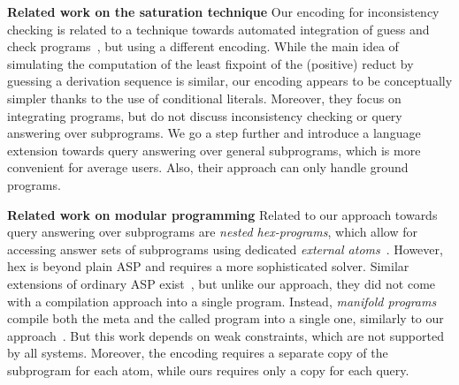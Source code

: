 \documentclass[11pt,fleqn,twoside]{article}
\newcommand{\leanparagraph}[1]{\smallskip\noindent\textbf{#1}}
\newcommand\hex{{\sc hex}\xspace}
\begin{document}
		\leanparagraph{Related work on the saturation technique}
		Our encoding for inconsistency checking is related to a technique towards automated integration of guess and check programs~\cite{DBLP:journals/tplp/EiterP06},
		but using a different encoding.
		While the main idea of simulating the computation of the least fixpoint of the (positive) reduct by guessing a derivation sequence
		is similar, our encoding appears to be conceptually simpler thanks to the use of conditional literals.
		Moreover, they focus on integrating programs,
		but do not discuss inconsistency checking or query answering over subprograms.
		We go a step further and introduce a language extension towards query answering over general subprograms,
		which is more convenient for average users.
		Also, their approach can only handle ground programs.


		\leanparagraph{Related work on modular programming}
		Related to our approach towards query answering over subprograms are \emph{nested \hex-programs}, which allow for accessing answer sets of subprograms using dedicated \emph{external atoms}~\cite{ekr2013-inap11}.
		However, \hex{} is beyond plain ASP and requires a more sophisticated solver.
		Similar extensions of ordinary ASP exist~\cite{DBLP:conf/asp/TariBA05}, but unlike our approach, they did not come with a compilation approach into a single program.
		Instead, \emph{manifold programs} compile both the meta and the called program into a single one, similarly to our approach~\cite{DBLP:conf/birthday/FaberW11}.
		But this work depends on weak constraints, which are not supported by all systems. Moreover, the encoding requires a separate copy of the subprogram for each atom,
		while ours requires only a copy for each query.
\end{document}
